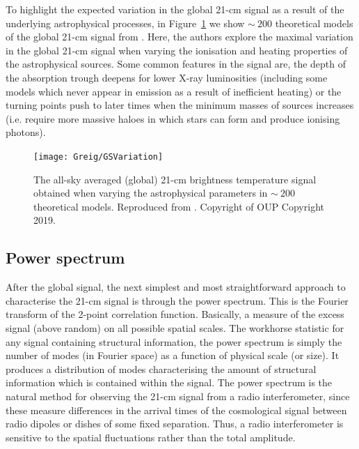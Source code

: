 To highlight the expected variation in the global 21-cm signal as a result of the underlying astrophysical processes, in Figure~\ref{fig:global_vary} we show $\sim~200$ theoretical models of the global 21-cm signal from \cite{Cohen:2017}. Here, the authors explore the maximal variation in the global 21-cm signal when varying the ionisation and heating properties of the astrophysical sources. Some common features in the signal are, the depth of the absorption trough deepens for lower X-ray luminosities (including some models which never appear in emission as a result of inefficient heating) or the turning points push to later times when the minimum masses of sources increases (i.e. require more massive haloes in which stars can form and produce ionising photons).

\begin{figure}[]
\begin{center}
\texttt{[image: Greig/GSVariation]}
\end{center}
\caption{The all-sky averaged (global) 21-cm brightness temperature signal obtained when varying the astrophysical parameters in $\sim~200$ theoretical models. Reproduced from \cite{Cohen:2017}. Copyright of OUP Copyright 2019.}
\label{fig:global_vary}
\end{figure}

\subsection{Power spectrum} \label{sec:PS}

After the global signal, the next simplest and most straightforward approach to characterise the 21-cm signal is through the power spectrum. This is the Fourier transform of the 2-point correlation function. Basically, a measure of the excess signal (above random) on all possible spatial scales. The workhorse statistic for any signal containing structural information, the power spectrum is simply the number of modes (in Fourier space) as a function of physical scale (or size). It produces a distribution of modes characterising the amount of structural information which is contained within the signal. The power spectrum is the natural method for observing the 21-cm signal from a radio interferometer, since these measure differences in the arrival times of the cosmological signal between radio dipoles or dishes of some fixed separation. Thus, a radio interferometer is sensitive to the spatial fluctuations rather than the total amplitude.

